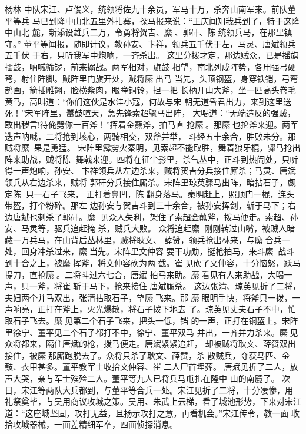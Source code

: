 杨林
中队宋江、卢俊义，统领将佐九十余员，军马十万，杀奔山南军来。前队董平等兵
马已到隆中山北五里外扎寨，探马报来说：“王庆闻知我兵到了，特于这隆中山北
麓，新添设雄兵二万，令勇将贺吉、縻、郭矸、陈统领兵马，在那里镇守。”
董平等闻报，随即计议，教孙安、卞祥，领兵五千伏于左，马灵、唐斌领兵五千伏
于右，只听我军中炮响，一齐杀出。
这里分拨才定，那边贼众，已是摇旗擂鼓，呐喊筛锣，前来搦战。两军相对，旗鼓
相望，南北列成阵势，各用强弓硬弩，射住阵脚。贼阵里门旗开处，贼将縻出马
当先，头顶钢盔，身穿铁铠，弓弯鹊画，箭插雕翎，脸横紫肉，眼睁铜铃，担一把
长柄开山大斧，坐一匹高头卷毛黄马，高叫道：“你们这伙是水洼小寇，何故与宋
朝无道昏君出力，来到这里送死！”宋军阵里，鼍鼓喧天，急先锋索超骤马出阵，
大喝道：“无端造反的强贼，敢出秽言!待俺劈你一百斧！”挥着金蘸斧，拍马直
抢縻。那縻也抡斧来迎。两军迭声呐喊，二将抢到垓心，两骑相交，双斧并举，
斗经五十余合，胜败未分。那贼将縻，果是勇猛。
宋阵里霹雳火秦明，见索超不能取胜，舞着狼牙棍，骤马抢出阵来助战，贼将陈
舞戟来迎。四将在征尘影里，杀气丛中，正斗到热闹处，只听得一声炮响，孙安、
卞祥领兵从左边杀来，贼将贺吉分兵接住厮杀；马灵、唐斌领兵从右边杀来，贼将
郭矸分兵接住厮杀。宋阵里琼英骤马出阵，暗拈石子，觑定陈，只一石子飞来，
正打着鼻凹，陈翻身落马。秦明赶上，照顶门一棍，连头带盔，打个粉碎。那左
边孙安与贺吉斗到三十余合，被孙安挥剑，斩于马下；右边唐斌也刺杀了郭矸。縻
见众人失利，架住了索超金蘸斧，拨马便走。索超、孙安、马灵等，驱兵追赶掩
杀，贼兵大败。
众将追赶縻，刚刚转过山嘴，被贼人暗藏一万兵马，在山背后丛林里，贼将耿文、
薛赞，领兵抢出林来，与縻合兵一处，回身冲杀过来，縻当先。宋阵里文仲容
要干功勋，挺枪拍马，来斗縻，战斗到十合之上，被縻挥斧，将文仲容砍为两
截。崔见砍了文仲容，十分恼怒，跃马提刀，直抢縻。二将斗过六七合，唐斌
拍马来助。縻看见有人来助战，大喝一声，只一斧，将崔斩于马下，抢来接住
唐斌厮杀。
这边张清、琼英见折了二将，夫妇两个并马双出，张清拈取石子，望縻飞来。那
縻眼明手快，将斧只一拨，一声响亮，正打在斧上，火光爆散，将石子拨下地去
了。琼英见丈夫石子不中，忙取石子飞去。縻见第二个石子飞来，把头一低，铛
的一声，正打在铜盔上。宋阵里徐宁、董平见二个石子都打不中，徐宁、董平双马
并出，一齐并力杀来。縻见众将都来，隔住唐斌的枪，拨马便走。唐斌紧紧追赶，
却被贼将耿文、薛赞双出接住，被縻那厮跑脱去了。众将只杀了耿文、薛赞，杀
散贼兵，夺获马匹、金鼓、衣甲甚多。董平教军士收拾文仲容、崔二人尸首埋葬。
唐斌见折了二人，放声大哭，亲与军士殡殓二人。董平等九人已将兵马屯扎在隆中
山的南麓了。
次日，宋江等两队大兵都到，与董平等合兵一处。宋江见折了二将，十分凄惨，用
礼祭奠毕，与吴用商议攻城之策。吴用、朱武上云梯，看了城池形势，下来对宋江
道：“这座城坚固，攻打无益，且扬示攻打之意，再看机会。”宋江传令，教一面
收拾攻城器械，一面差精细军卒，四面侦探消息。
